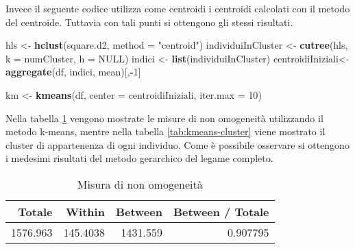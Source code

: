 \documentclass[]{book}
\newenvironment{Shaded}{\begin{snugshade}}{\end{snugshade}}
\newcommand{\KeywordTok}[1]{\textcolor[rgb]{0.13,0.29,0.53}{\textbf{#1}}}
\newcommand{\DataTypeTok}[1]{\textcolor[rgb]{0.13,0.29,0.53}{#1}}
\newcommand{\DecValTok}[1]{\textcolor[rgb]{0.00,0.00,0.81}{#1}}
\newcommand{\StringTok}[1]{\textcolor[rgb]{0.31,0.60,0.02}{#1}}
\newcommand{\OtherTok}[1]{\textcolor[rgb]{0.56,0.35,0.01}{#1}}
\newcommand{\OperatorTok}[1]{\textcolor[rgb]{0.81,0.36,0.00}{\textbf{#1}}}
\newcommand{\NormalTok}[1]{#1}
\begin{document}
Invece il seguente codice utilizza come centroidi i centroidi calcolati
con il metodo del centroide. Tuttavia con tali punti si ottengono gli
stessi risultati.

\begin{Shaded}
\begin{Highlighting}[]
\NormalTok{hls <-}\StringTok{  }\KeywordTok{hclust}\NormalTok{(square.d2, }\DataTypeTok{method =} \StringTok{"centroid"}\NormalTok{)}
\NormalTok{individuiInCluster <-}\StringTok{ }\KeywordTok{cutree}\NormalTok{(hls, }\DataTypeTok{k =}\NormalTok{ numCluster, }\DataTypeTok{h =} \OtherTok{NULL}\NormalTok{)}
\NormalTok{indici <-}\StringTok{ }\KeywordTok{list}\NormalTok{(individuiInCluster)}
\NormalTok{centroidiIniziali<-}\KeywordTok{aggregate}\NormalTok{(df, indici, mean)[,}\OperatorTok{-}\DecValTok{1}\NormalTok{]}

\NormalTok{km <-}\StringTok{ }\KeywordTok{kmeans}\NormalTok{(df, }\DataTypeTok{center =}\NormalTok{ centroidiIniziali, }\DataTypeTok{iter.max =} \DecValTok{10}\NormalTok{)}
\end{Highlighting}
\end{Shaded}

Nella tabella \ref{tab:kmeans-misure-omogeneita} vengono mostrate le
misure di non omogeneità utilizzando il metodo k-means, mentre nella
tabella \ref{tab:kmeans-cluster} viene mostrato il cluster di
appartenenza di ogni individuo. Come è possibile osservare si ottengono
i medesimi risultati del metodo gerarchico del legame completo.

\begin{table}

\caption{\label{tab:kmeans-misure-omogeneita}Misura di non omogeneità}
\centering
\begin{tabular}[t]{r|r|r|r}
\hline
Totale & Within & Between & Between / Totale\\
\hline
1576.963 & 145.4038 & 1431.559 & 0.907795\\
\hline
\end{tabular}
\end{table}
\end{document}
